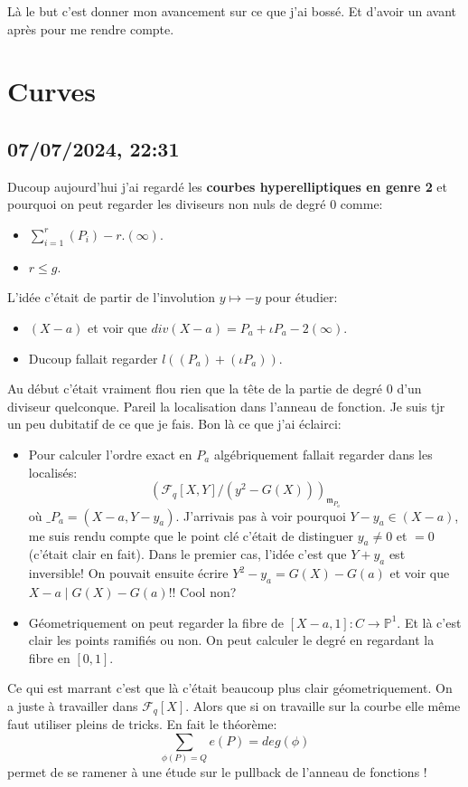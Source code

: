 \documentclass[12pt]{article}
\newcommand{\F}{\mathscr{F}}
\theoremstyle{plain}
\theoremstyle{definition}
\theoremstyle{remark}
\begin{document}
Là le but c'est donner mon avancement sur ce que j'ai bossé. Et d'avoir
un avant après pour me rendre compte.
\section{Curves}
\subsection{07/07/2024, 22:31}
Ducoup aujourd'hui j'ai regardé les \textbf{courbes hyperelliptiques en
genre 2} et pourquoi on peut regarder les diviseurs non nuls de degré
$0$ comme:
\begin{itemize}
    \item $\sum_{i=1}^r (P_i) - r.(\infty)$.
    \item $r\leq g$.
\end{itemize}
L'idée c'était de partir de l'involution $y\mapsto -y$ pour étudier:
\begin{itemize}
    \item $(X-a)$ et voir que $div(X-a) = P_a+\iota P_a - 2(\infty)$.
    \item Ducoup fallait regarder $l((P_a)+(\iota P_a))$.
\end{itemize}
Au début c'était vraiment flou rien que la tête de la partie de degré $0$
d'un diviseur quelconque. Pareil la localisation dans l'anneau de 
fonction. Je suis tjr un peu dubitatif de ce que je fais. Bon là ce que
j'ai éclairci:
\begin{itemize}
    \item Pour calculer l'ordre exact en $P_a$ algébriquement fallait
        regarder dans les localisés: 
        \[(\F_q[X,Y]/(y^2-G(X)))_{\mathfrak m_{P_a}}\]
où $\mathfrak_{P_a} = (X-a, Y-y_a)$. J'arrivais pas à voir pourquoi 
$Y-y_a\in (X-a)$, me suis rendu compte que le point clé c'était de 
distinguer $y_a\ne 0$ et $=0$ (c'était clair en fait). Dans le premier
cas, l'idée c'est que $Y+y_a$ est inversible! On pouvait ensuite écrire
$Y^2-y_a = G(X)-G(a)$ et voir que $X-a\mid G(X)-G(a)$!! Cool non?
    \item Géometriquement on peut regarder la fibre de 
        $[X-a,1] : C\to \mathbb P^1$. Et là c'est clair les points
        ramifiés ou non. On peut calculer le degré en regardant la fibre
        en $[0,1]$.
\end{itemize}
Ce qui est marrant c'est que là c'était beaucoup plus clair 
géometriquement. On a juste à travailler dans $\F_q[X]$. Alors que
si on travaille sur la courbe elle même faut utiliser pleins de tricks.
En fait le théorème:
\[\sum_{\phi(P)= Q} e(P) = deg(\phi)\]
permet de se ramener à une étude sur le pullback de l'anneau de fonctions
! 
\end{document}
